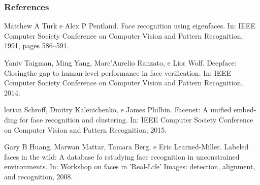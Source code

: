 \documentclass{beamer}
\begin{document}
\begin{frame}[allowframebreaks]
\frametitle{References}
\footnotesize{
\begin{thebibliography}{99} %
 Matthew A Turk e Alex P Pentland.
\newblock Face recognition using eigenfaces.
\newblock  In: IEEE Computer Society Conference on Computer Vision and Pattern Recognition, 1991, pages 586–591.

 Yaniv Taigman, Ming Yang, Marc’Aurelio Ranzato, e Lior Wolf.
\newblock Deepface: Closingthe gap to human-level performance in face verification.
\newblock  In: IEEE Computer Society Conference on Computer Vision and Pattern Recognition, 2014.

 lorian Schroff, Dmitry Kalenichenko, e James Philbin.
\newblock Facenet: A unified embed-ding for face recognition and clustering.
\newblock  In: IEEE Computer Society Conference on Computer Vision and Pattern Recognition, 2015.

 Gary B Huang, Marwan Mattar, Tamara Berg, e Eric Learned-Miller.  
\newblock Labeled faces in the wild: A database fo rstudying face recognition in unconstrained environments.
\newblock  In: Workshop on faces in ’Real-Life’ Images: detection, alignment, and recognition, 2008.

\end{thebibliography}
}
\end{frame}
\end{document}
